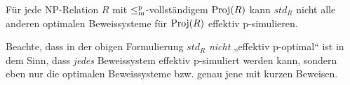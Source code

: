 \begin{conjecture}\label{conj:kvl-ps}
    Für jede NP-Relation $R$ mit $\leq_\mathrm{m}^\mathrm{p}$-vollständigem $\operatorname{Proj}(R)$ kann $\mathit{std}_R$ nicht alle anderen optimalen Beweissysteme für $\operatorname{Proj}(R)$ effektiv p-simulieren.


\end{conjecture}
Beachte, dass in der obigen Formulierung $\mathit{std}_R$ \emph{nicht} „effektiv p-optimal“ ist in dem Sinn, dass \emph{jedes} Beweissystem effektiv p-simuliert werden kann, sondern eben nur die optimalen Beweissysteme bzw. genau jene mit kurzen Beweisen.

